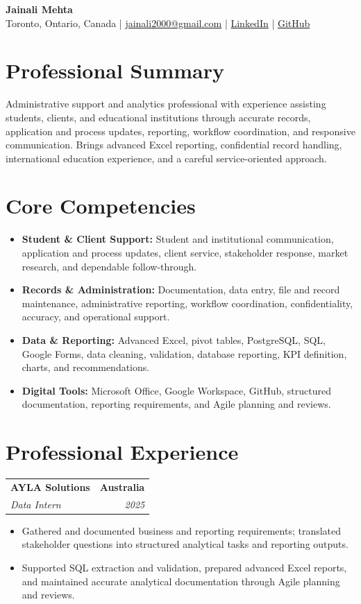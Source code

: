\documentclass[letterpaper,10pt]{article}
\makeatletter
\newcommand{\role}[4]{%
  \begin{tabularx}{\textwidth}{@{}Xr@{}}
    \textbf{#1} & \textbf{#2} \\
    \textit{#3} & \textit{#4}
  \end{tabularx}\vspace{-1pt}
}
\makeatother
\begin{document}
\begin{center}
  {\fontsize{17}{19}\selectfont\textbf{Jainali Mehta}}\\[2pt]
  \small Toronto, Ontario, Canada \;|\;
  \href{mailto:jainali2000@gmail.com}{jainali2000@gmail.com} \;|\;
  \href{https://www.linkedin.com/in/jainali-mehta}{LinkedIn} \;|\;
  \href{https://github.com/jainalimehta}{GitHub}
\end{center}
\vspace{-7pt}

\section{Professional Summary}
\small Administrative support and analytics professional with experience assisting students, clients, and educational institutions through accurate records, application and process updates, reporting, workflow coordination, and responsive communication. Brings advanced Excel reporting, confidential record handling, international education experience, and a careful service-oriented approach.

\section{Core Competencies}
\begin{itemize}[leftmargin=0.16in,label=\textbullet,topsep=0pt,itemsep=1pt,parsep=0pt]
  \item \small \textbf{Student \& Client Support:} Student and institutional communication, application and process updates, client service, stakeholder response, market research, and dependable follow-through.
  \item \small \textbf{Records \& Administration:} Documentation, data entry, file and record maintenance, administrative reporting, workflow coordination, confidentiality, accuracy, and operational support.
  \item \small \textbf{Data \& Reporting:} Advanced Excel, pivot tables, PostgreSQL, SQL, Google Forms, data cleaning, validation, database reporting, KPI definition, charts, and recommendations.
  \item \small \textbf{Digital Tools:} Microsoft Office, Google Workspace, GitHub, structured documentation, reporting requirements, and Agile planning and reviews.
\end{itemize}

\section{Professional Experience}
\role{AYLA Solutions}{Australia}{Data Intern}{2025}
\begin{itemize}
  \item Gathered and documented business and reporting requirements; translated stakeholder questions into structured analytical tasks and reporting outputs.
  \item Supported SQL extraction and validation, prepared advanced Excel reports, and maintained accurate analytical documentation through Agile planning and reviews.
\end{itemize}
\vspace{1pt}
\end{document}
